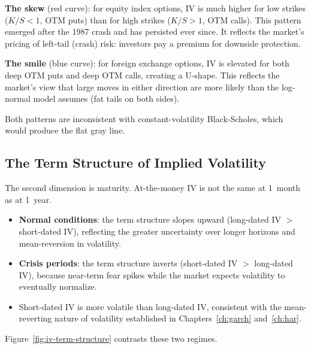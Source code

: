 \textbf{The skew} (red curve): for equity index options, IV is much higher for low strikes ($K/S < 1$, OTM puts) than for high strikes ($K/S > 1$, OTM calls).
This pattern emerged after the 1987 crash and has persisted ever since.
It reflects the market's pricing of left-tail (crash) risk: investors pay a premium for downside protection.

\textbf{The smile} (blue curve): for foreign exchange options, IV is elevated for both deep OTM puts and deep OTM calls, creating a U-shape.
This reflects the market's view that large moves in either direction are more likely than the log-normal model assumes (fat tails on both sides).

Both patterns are inconsistent with constant-volatility Black-Scholes, which would produce the flat gray line.

\subsection{The Term Structure of Implied Volatility}
\label{sec:iv-term-structure}

The second dimension is maturity.
At-the-money IV is not the same at 1~month as at 1~year.

\begin{keyidea}
\begin{itemize}[nosep]
  \item \textbf{Normal conditions}: the term structure slopes upward (long-dated IV $>$ short-dated IV), reflecting the greater uncertainty over longer horizons and mean-reversion in volatility.
  \item \textbf{Crisis periods}: the term structure inverts (short-dated IV $>$ long-dated IV), because near-term fear spikes while the market expects volatility to eventually normalize.
  \item Short-dated IV is more volatile than long-dated IV, consistent with the mean-reverting nature of volatility established in Chapters~\ref{ch:garch} and~\ref{ch:har}.
\end{itemize}
\end{keyidea}

Figure~\ref{fig:iv-term-structure} contrasts these two regimes.

